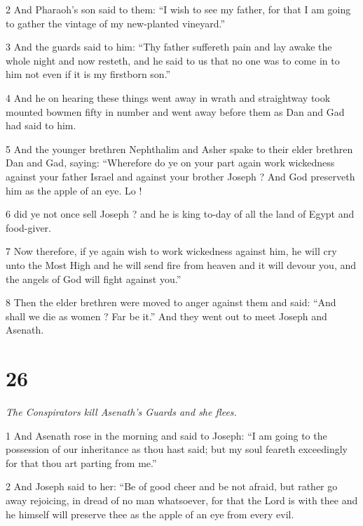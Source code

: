 \par 2 And Pharaoh's son said to them: “I wish to see my father, for that I am going to gather the vintage of my new-planted vineyard.” 

\par 3 And the guards said to him: “Thy father suffereth pain and lay awake the whole night and now resteth, and he said to us that no one was to come in to him not even if it is my firstborn son.” 

\par 4 And he on hearing these things went away in wrath and straightway took mounted bowmen fifty in number and went away before them as Dan and Gad had said to him. 

\par 5 And the younger brethren Nephthalim and Asher spake to their elder brethren Dan and Gad, saying: “Wherefore do ye on your part again work wickedness against your father Israel and against your brother Joseph ? And God preserveth him as the apple of an eye. Lo ! 

\par 6 did ye not once sell Joseph ? and he is king to-day of all the land of Egypt and food-giver. 

\par 7 Now therefore, if ye again wish to work wickedness against him, he will cry unto the Most High and he will send fire from heaven and it will devour you, and the angels of God will fight against you.” 

\par 8 Then the elder brethren were moved to anger against them and said: “And shall we die as women ? Far be it.” And they went out to meet Joseph and Asenath. 

\chapter{26}

\par \textit{The Conspirators kill Asenath's Guards and she flees.}


\par 1 And Asenath rose in the morning and said to Joseph: “I am going to the possession of our inheritance as thou hast said; but my soul feareth exceedingly for that thou art parting from me.” 

\par 2 And Joseph said to her: “Be of good cheer and be not afraid, but rather go away rejoicing, in dread of no man whatsoever, for that the Lord is with thee and he himself will preserve thee as the apple of an eye from every evil. 

